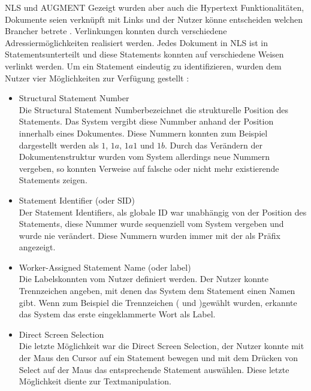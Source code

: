 \begin{section}{NLS und AUGMENT}
Gezeigt wurden aber auch die Hypertext Funktionalitäten, Dokumente seien verknüpft mit Links und der Nutzer könne entscheiden welchen \glqq Branch\grqq{ }er betrete \cite{MotherOfDemo1968}. Verlinkungen konnten durch verschiedene Adressiermöglichkeiten realisiert werden. Jedes Dokument in NLS ist in \glqq Statements\grqq{ }unterteilt und diese Statements konnten auf verschiedene Weisen verlinkt werden. Um ein Statement eindeutig zu identifizieren, wurden dem Nutzer vier Möglichkeiten zur Verfügung gestellt \cite{Engelbart1984}: 

\begin{itemize}
\item Structural Statement Number\hfill \\
Die \glqq Structural Statement Number\grqq{ }bezeichnet die strukturelle Position des Statements. Das System vergibt diese Nummber anhand der Position innerhalb eines Dokumentes. Diese Nummern konnten zum Beispiel dargestellt werden als $1$, $1a$, $1a1$ und $1b$. Durch das Verändern der Dokumentenstruktur wurden vom System allerdings neue Nummern vergeben, so konnten Verweise auf falsche oder nicht mehr existierende Statements zeigen.
\item Statement Identifier (oder SID)\hfill \\
Der \glqq Statement Identifiers\grqq{ }, als globale ID war unabhängig von der Position des Statements, diese Nummer wurde sequenziell vom System vergeben und wurde nie verändert. Diese Nummern wurden immer mit der \grqq{ }als Präfix angezeigt.
\item Worker-Assigned Statement Name (oder label)\hfill \\
Die \glqq Labels\grqq{ }konnten vom Nutzer definiert werden. Der Nutzer konnte Trennzeichen angeben, mit denen das System dem Statement einen Namen gibt. Wenn zum Beispiel die Trennzeichen \glqq (\grqq{ } und \glqq )\grqq{ }gewählt wurden, erkannte das System das erste eingeklammerte Wort als Label.
\item Direct Screen Selection\hfill \\
Die letzte Möglichkeit war die \glqq Direct Screen Selection\grqq, der Nutzer konnte mit der Maus den Cursor auf ein Statement bewegen und mit dem Drücken von \glqq Select\grqq{ } auf der Maus das entsprechende Statement auswählen. Diese letzte Möglichkeit diente zur Textmanipulation.
\end{itemize}


\end{section}
